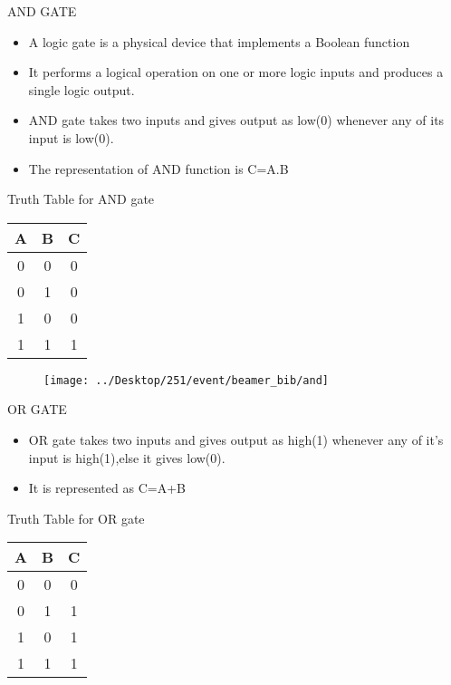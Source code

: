 \documentclass{beamer}
\begin{document}
\begin{frame}{AND GATE}
\begin{block}{}
    \begin{itemize}
	\item A logic gate is a physical device that implements a Boolean function
	\item It performs a logical operation on one or more logic inputs and produces a single logic output.
	\item AND gate takes two inputs and gives output as low(0) whenever any of its input is low(0).   
	\item The representation of \alert{AND} function is \alert{C=A.B} 
    \end{itemize}
  \end{block}
\pause
\begin{block}{Truth Table for AND gate}
\begin{tabular}{|c|c||c|}
\hline
 \textbf{A} &
\textbf{B} & \textbf{C} \\
\hline
\hline
 0 & 0 & 0 \\
\hline
 0 & 1 & 0 \\
\hline
 1 & 0 & 0 \\
\hline
 1 & 1 & 1 \\
\hline
\end{tabular}
\end{block}
\end{frame}
\begin{frame}
\begin{figure}
\texttt{[image: ../Desktop/251/event/beamer\_bib/and]} 
\end{figure}
\end{frame}
\begin{frame}{OR GATE}
\begin{block}{}
\begin{itemize}
  \item OR gate takes two inputs and gives output as high(1) whenever any of it's input is high(1),else it gives low(0).
  \item It is represented as \alert{C=A+B}
\end{itemize}
\end{block}
\medskip
\medskip
\pause
\begin{block}{Truth Table for OR gate}
\begin{tabular}{|c|c||c|}
\hline
 \textbf{A} &
\textbf{B} & \textbf{C} \\
\hline
\hline
 0 & 0 & 0 \\
\hline
 0 & 1 & 1 \\
\hline
 1 & 0 & 1 \\
\hline
 1 & 1 & 1 \\
\hline
\end{tabular}
\end{block}
\end{frame}
\end{document}
